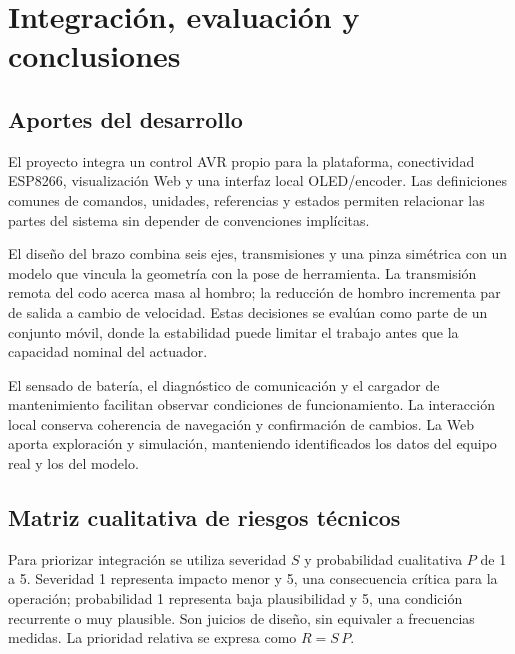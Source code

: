 \chapter{Integración, evaluación y conclusiones}
\label{cap:cierre}

\section{Aportes del desarrollo}
El proyecto integra un control AVR propio para la plataforma, conectividad ESP8266, visualización Web y una interfaz local OLED/encoder. Las definiciones comunes de comandos, unidades, referencias y estados permiten relacionar las partes del sistema sin depender de convenciones implícitas.

El diseño del brazo combina seis ejes, transmisiones y una pinza simétrica con un modelo que vincula la geometría con la pose de herramienta. La transmisión remota del codo acerca masa al hombro; la reducción de hombro incrementa par de salida a cambio de velocidad. Estas decisiones se evalúan como parte de un conjunto móvil, donde la estabilidad puede limitar el trabajo antes que la capacidad nominal del actuador.

El sensado de batería, el diagnóstico de comunicación y el cargador de mantenimiento facilitan observar condiciones de funcionamiento. La interacción local conserva coherencia de navegación y confirmación de cambios. La Web aporta exploración y simulación, manteniendo identificados los datos del equipo real y los del modelo.

\section{Matriz cualitativa de riesgos técnicos}
Para priorizar integración se utiliza severidad $S$ y probabilidad cualitativa $P$ de 1 a 5. Severidad 1 representa impacto menor y 5, una consecuencia crítica para la operación; probabilidad 1 representa baja plausibilidad y 5, una condición recurrente o muy plausible. Son juicios de diseño, sin equivaler a frecuencias medidas. La prioridad relativa se expresa como $R=S\,P$.

